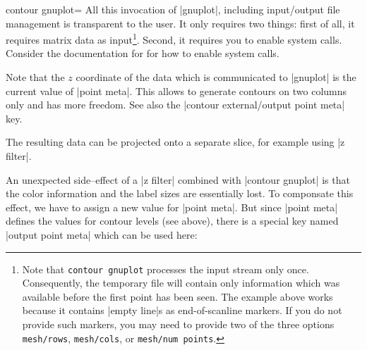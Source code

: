 {{\begin{plottype}[/pgfplots]{contour gnuplot=\textcolor{black}{}}
	All this invocation of |gnuplot|, including input/output file management is transparent to the user. It only requires two things: first of all, it requires matrix data as input\footnote{Note that \texttt{contour gnuplot} processes the input stream only once. Consequently, the temporary file will contain only information which was available before the first point has been seen. The example above works because it contains |empty line|s as end-of-scanline markers. If you do not provide such markers, you may need to provide two of the three options \texttt{mesh/rows}, \texttt{mesh/cols}, or \texttt{mesh/num points}.}. Second, it requires you to enable system calls. Consider the documentation for  for how to enable system calls.

	Note that the $z$ coordinate of the data which is communicated to |gnuplot| is the current value of |point meta|. This allows to generate contours on two columns only and has more freedom. See also the |contour external/output point meta| key.

	The resulting data can be projected onto a separate slice, for example using |z filter|.
\pgfplotsexpensiveexample
\begin{codeexample}[]%
%
\end{codeexample}
	
	An unexpected side--effect of a |z filter| combined with |contour gnuplot| is that the color information and the label sizes are essentially lost. To componsate this effect, we have to assign a new value for |point meta|. But since |point meta| defines the values for contour levels (see above), there is a special key named |output point meta| which can be used here:

\pgfplotsexpensiveexample
\begin{codeexample}[]%
\end{codeexample}
\end{plottype}}}

